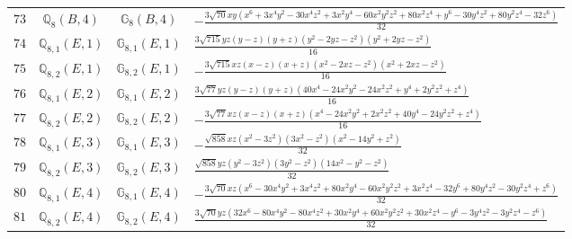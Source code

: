 \documentclass[fleqn,8pt,landscape]{jsarticle}
\begin{document}
\begin{table}[ht!]
\begin{center}
\begin{tabular}{cccl}
$ 73 $ & $ \mathbb{Q}_{8}(B,4) $ & $ \mathbb{G}_{8}(B,4) $ & $ - \frac{3 \sqrt{70} x y \left(x^{6} + 3 x^{4} y^{2} - 30 x^{4} z^{2} + 3 x^{2} y^{4} - 60 x^{2} y^{2} z^{2} + 80 x^{2} z^{4} + y^{6} - 30 y^{4} z^{2} + 80 y^{2} z^{4} - 32 z^{6}\right)}{32} $ \\
$ 74 $ & $ \mathbb{Q}_{8,1}(E,1) $ & $ \mathbb{G}_{8,1}(E,1) $ & $ \frac{3 \sqrt{715} y z \left(y - z\right) \left(y + z\right) \left(y^{2} - 2 y z - z^{2}\right) \left(y^{2} + 2 y z - z^{2}\right)}{16} $ \\
$ 75 $ & $ \mathbb{Q}_{8,2}(E,1) $ & $ \mathbb{G}_{8,2}(E,1) $ & $ - \frac{3 \sqrt{715} x z \left(x - z\right) \left(x + z\right) \left(x^{2} - 2 x z - z^{2}\right) \left(x^{2} + 2 x z - z^{2}\right)}{16} $ \\
$ 76 $ & $ \mathbb{Q}_{8,1}(E,2) $ & $ \mathbb{G}_{8,1}(E,2) $ & $ \frac{3 \sqrt{77} y z \left(y - z\right) \left(y + z\right) \left(40 x^{4} - 24 x^{2} y^{2} - 24 x^{2} z^{2} + y^{4} + 2 y^{2} z^{2} + z^{4}\right)}{16} $ \\
$ 77 $ & $ \mathbb{Q}_{8,2}(E,2) $ & $ \mathbb{G}_{8,2}(E,2) $ & $ - \frac{3 \sqrt{77} x z \left(x - z\right) \left(x + z\right) \left(x^{4} - 24 x^{2} y^{2} + 2 x^{2} z^{2} + 40 y^{4} - 24 y^{2} z^{2} + z^{4}\right)}{16} $ \\
$ 78 $ & $ \mathbb{Q}_{8,1}(E,3) $ & $ \mathbb{G}_{8,1}(E,3) $ & $ - \frac{\sqrt{858} x z \left(x^{2} - 3 z^{2}\right) \left(3 x^{2} - z^{2}\right) \left(x^{2} - 14 y^{2} + z^{2}\right)}{32} $ \\
$ 79 $ & $ \mathbb{Q}_{8,2}(E,3) $ & $ \mathbb{G}_{8,2}(E,3) $ & $ \frac{\sqrt{858} y z \left(y^{2} - 3 z^{2}\right) \left(3 y^{2} - z^{2}\right) \left(14 x^{2} - y^{2} - z^{2}\right)}{32} $ \\
$ 80 $ & $ \mathbb{Q}_{8,1}(E,4) $ & $ \mathbb{G}_{8,1}(E,4) $ & $ - \frac{3 \sqrt{70} x z \left(x^{6} - 30 x^{4} y^{2} + 3 x^{4} z^{2} + 80 x^{2} y^{4} - 60 x^{2} y^{2} z^{2} + 3 x^{2} z^{4} - 32 y^{6} + 80 y^{4} z^{2} - 30 y^{2} z^{4} + z^{6}\right)}{32} $ \\
$ 81 $ & $ \mathbb{Q}_{8,2}(E,4) $ & $ \mathbb{G}_{8,2}(E,4) $ & $ \frac{3 \sqrt{70} y z \left(32 x^{6} - 80 x^{4} y^{2} - 80 x^{4} z^{2} + 30 x^{2} y^{4} + 60 x^{2} y^{2} z^{2} + 30 x^{2} z^{4} - y^{6} - 3 y^{4} z^{2} - 3 y^{2} z^{4} - z^{6}\right)}{32} $ \\
 \hline \hline
\end{tabular}
\end{center}
\end{table}
\end{document}
